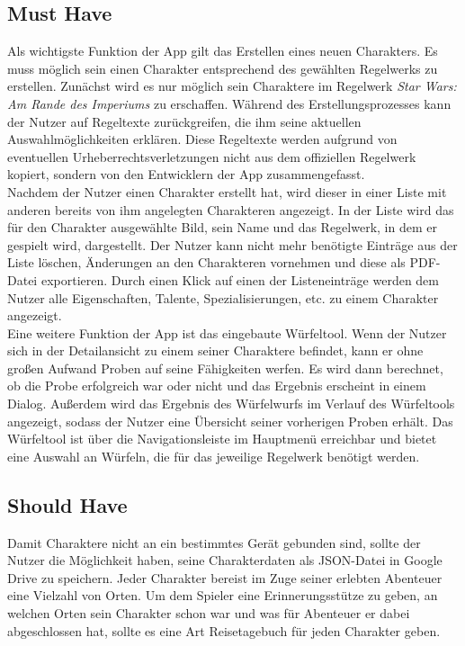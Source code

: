 \subsection{Must Have}
Als wichtigste Funktion der App gilt das Erstellen eines neuen Charakters. Es muss möglich sein einen Charakter entsprechend des gewählten Regelwerks zu erstellen. Zunächst wird es nur möglich sein Charaktere im Regelwerk \textit{Star Wars: Am Rande des Imperiums} zu erschaffen. Während des Erstellungsprozesses kann der Nutzer auf Regeltexte zurückgreifen, die ihm seine aktuellen Auswahlmöglichkeiten erklären. Diese Regeltexte werden aufgrund von eventuellen Urheberrechtsverletzungen nicht aus dem offiziellen Regelwerk kopiert, sondern von den Entwicklern der App zusammengefasst.\\

Nachdem der Nutzer einen Charakter erstellt hat, wird dieser in einer Liste mit anderen bereits von ihm angelegten Charakteren angezeigt. In der Liste wird das für den Charakter ausgewählte Bild, sein Name und das Regelwerk, in dem er gespielt wird, dargestellt. Der Nutzer kann nicht mehr benötigte Einträge aus der Liste löschen, Änderungen an den Charakteren vornehmen und diese als PDF-Datei exportieren. Durch einen Klick auf einen der Listeneinträge werden dem Nutzer alle Eigenschaften, Talente, Spezialisierungen, etc. zu einem Charakter angezeigt.\\

Eine weitere Funktion der App ist das eingebaute Würfeltool. Wenn der Nutzer sich in der Detailansicht zu einem seiner Charaktere befindet, kann er ohne großen Aufwand Proben auf seine Fähigkeiten werfen. Es wird dann berechnet, ob die Probe erfolgreich war oder nicht und das Ergebnis erscheint in einem Dialog. Außerdem wird das Ergebnis des Würfelwurfs im Verlauf des Würfeltools angezeigt, sodass der Nutzer eine Übersicht seiner vorherigen Proben erhält. Das Würfeltool ist über die Navigationsleiste im Hauptmenü erreichbar und bietet eine Auswahl an Würfeln, die für das jeweilige Regelwerk benötigt werden.

\subsection{Should Have}
Damit Charaktere nicht an ein bestimmtes Gerät gebunden sind, sollte der Nutzer die Möglichkeit haben, seine Charakterdaten als JSON-Datei in Google Drive zu speichern. Jeder Charakter bereist im Zuge seiner erlebten Abenteuer eine Vielzahl von Orten. Um dem Spieler eine Erinnerungsstütze zu geben, an welchen Orten sein Charakter schon war und was für Abenteuer er dabei abgeschlossen hat, sollte es eine Art Reisetagebuch für jeden Charakter geben.

